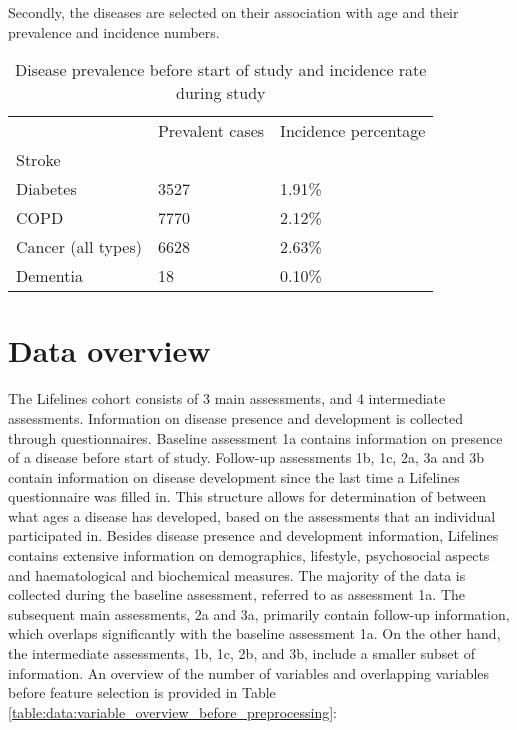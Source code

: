Secondly, the diseases are selected on their association with age and their prevalence and incidence numbers. 
\vspace{0.5cm}
\begin{table} [H]
    \centering
    \caption{Disease prevalence before start of study and incidence rate during study}
    \begin{tabular}{lll}
    \cline{1-3}
                       & Prevalent cases & Incidence percentage\\ \cline{1-3}
    Stroke             &                 &                    \\
    Diabetes           & 3527            & 1.91\%             \\
    COPD               & 7770            & 2.12\%              \\
    Cancer (all types) & 6628            & 2.63\%              \\
    Dementia           & 18              & 0.10\%             
    \end{tabular}
    \label{table:data:disease_prevalence_incidence}
\end{table} 

\section{Data overview}
\label{section:data:data_overview}
The Lifelines cohort consists of 3 main assessments, and 4 intermediate assessments. Information on disease presence and development is collected through questionnaires. Baseline assessment 1a contains information on presence of a disease before start of study. Follow-up assessments 1b, 1c, 2a, 3a and 3b contain information on disease development since the last time a Lifelines questionnaire was filled in. This structure allows for determination of between what ages a disease has developed, based on the assessments that an individual participated in. Besides disease presence and development information, Lifelines contains extensive information on demographics, lifestyle, psychosocial aspects and haematological and biochemical measures.  The majority of the data is collected during the baseline assessment, referred to as assessment 1a. The subsequent main assessments, 2a and 3a, primarily contain follow-up information, which overlaps significantly with the baseline assessment 1a. On the other hand, the intermediate assessments, 1b, 1c, 2b, and 3b, include a smaller subset of information. An overview of the number of variables and overlapping variables before feature selection is provided in Table \ref{table:data:variable_overview_before_preprocessing}: 

